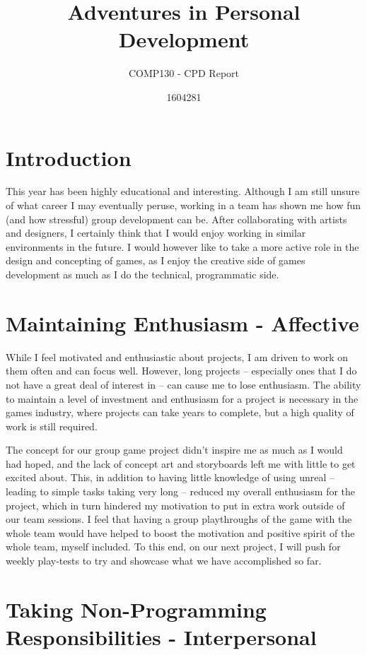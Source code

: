 \documentclass{scrartcl}
\title{Adventures in Personal Development}
\subtitle{COMP130 - CPD Report}
\author{1604281}
\begin{document}
\maketitle

\section{Introduction}

This year has been highly educational and interesting. Although I am still unsure of what career I may eventually peruse, working in a team has shown me how fun (and how stressful) group development can be. After collaborating with artists and designers, I certainly think that I would enjoy working in similar environments in the future.
I would however like to take a more active role in the design and concepting of games, as I enjoy the creative side of games development as much as I do the technical, programmatic side.


\section{Maintaining Enthusiasm - Affective}

While I feel motivated and enthusiastic about projects, I am driven to work on them often and can focus well. However, long projects – especially ones that I do not have a great deal of interest in – can cause me to lose enthusiasm. The ability to maintain a level of investment and enthusiasm for a project is necessary in the games industry, where projects can take years to complete, but a high quality of work is still required.

The concept for our group game project didn’t inspire me as much as I would had hoped, and the lack of concept art and storyboards left me with little to get excited about. This, in addition to having little knowledge of using unreal – leading to simple tasks taking very long – reduced my overall enthusiasm for the project, which in turn hindered my motivation to put in extra work outside of our team sessions. I feel that having a group playthroughs of the game with the whole team would have helped to boost the motivation and positive spirit of the whole team, myself included. To this end, on our next project, I will push for weekly play-tests to try and showcase what we have accomplished so far.



\section{Taking Non-Programming Responsibilities - Interpersonal}
\end{document}
